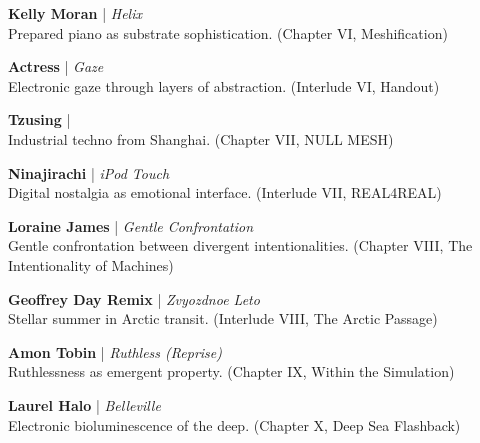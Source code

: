 {\smallskip

\noindent\textbf{Kelly Moran} | \textit{Helix}\\
Prepared piano as substrate sophistication. (Chapter VI, Meshification)

\smallskip

\noindent\textbf{Actress} | \textit{Gaze}\\
Electronic gaze through layers of abstraction. (Interlude VI, Handout)

\smallskip

\noindent\textbf{Tzusing} | \textit{}\\
Industrial techno from Shanghai. (Chapter VII, NULL MESH)

\smallskip

\noindent\textbf{Ninajirachi} | \textit{iPod Touch}\\
Digital nostalgia as emotional interface. (Interlude VII, REAL4REAL)

\smallskip

\noindent\textbf{Loraine James} | \textit{Gentle Confrontation}\\
Gentle confrontation between divergent intentionalities. (Chapter VIII, The Intentionality of Machines)

\smallskip

\noindent\textbf{Geoffrey Day Remix} | \textit{Zvyozdnoe Leto}\\
Stellar summer in Arctic transit. (Interlude VIII, The Arctic Passage)

\smallskip

\noindent\textbf{Amon Tobin} | \textit{Ruthless (Reprise)}\\
Ruthlessness as emergent property. (Chapter IX, Within the Simulation)

\smallskip

\noindent\textbf{Laurel Halo} | \textit{Belleville}\\
Electronic bioluminescence of the deep. (Chapter X, Deep Sea Flashback)

}



